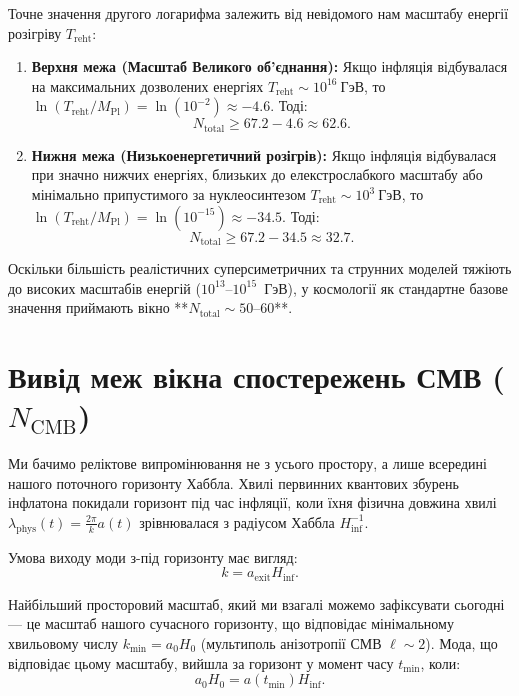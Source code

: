 Точне значення другого логарифма залежить від невідомого нам масштабу енергії розігріву $T_{\mathrm{reht}}$:
\begin{enumerate}
    \item \textbf{Верхня межа (Масштаб Великого об'єднання):} Якщо інфляція відбувалася на максимальних дозволених енергіях $T_{\mathrm{reht}} \sim 10^{16}~\text{ГэВ}$, то $\ln(T_{\mathrm{reht}}/M_{\mathrm{Pl}}) = \ln(10^{-2}) \approx -4.6$. Тоді:
    \begin{equation}
    N_{\mathrm{total}} \ge 67.2 - 4.6 \approx \mathbf{62.6}.
    \end{equation}
    \item \textbf{Нижня межа (Низькоенергетичний розігрів):} Якщо інфляція відбувалася при значно нижчих енергіях, близьких до елекстрослабкого масштабу або мінімально припустимого за нуклеосинтезом $T_{\mathrm{reht}} \sim 10^{3}~\text{ГэВ}$, то $\ln(T_{\mathrm{reht}}/M_{\mathrm{Pl}}) = \ln(10^{-15}) \approx -34.5$. Тоді:
    \begin{equation}
    N_{\mathrm{total}} \ge 67.2 - 34.5 \approx \mathbf{32.7}.
    \end{equation}
\end{enumerate}
Оскільки більшість реалістичних суперсиметричних та струнних моделей тяжіють до високих масштабів енергій ($10^{13}$--$10^{15}$~ГэВ), у космології як стандартне базове значення приймають вікно **$N_{\mathrm{total}} \sim 50$--$60$**.



\section{Вивід меж вікна спостережень СМВ ($N_{\mathrm{CMB}}$)}

Ми бачимо реліктове випромінювання не з усього простору, а лише всередині нашого поточного горизонту Хаббла. Хвилі первинних квантових збурень інфлатона покидали горизонт під час інфляції, коли їхня фізична довжина хвилі $\lambda_{\mathrm{phys}}(t) = \frac{2\pi}{k} a(t)$ зрівнювалася з радіусом Хаббла $H_{\mathrm{inf}}^{-1}$.

Умова виходу моди з-під горизонту має вигляд:
\begin{equation}
\label{eq:app_exit}
k = a_{\mathrm{exit}} H_{\mathrm{inf}}.
\end{equation}

Найбільший просторовий масштаб, який ми взагалі можемо зафіксувати сьогодні --- це масштаб нашого сучасного горизонту, що відповідає мінімальному хвильовому числу $k_{\mathrm{min}} = a_0 H_0$ (мультиполь анізотропії СМВ $\ell \sim 2$). Мода, що відповідає цьому масштабу, вийшла за горизонт у момент часу $t_{\mathrm{min}}$, коли:
\begin{equation}
a_0 H_0 = a(t_{\mathrm{min}}) H_{\mathrm{inf}}.
\end{equation}

